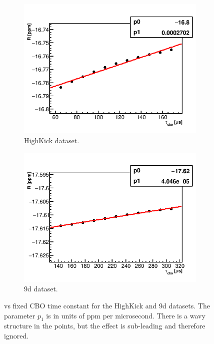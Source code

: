 \begin{figure}[h]
\centering
    \begin{subfigure}[t]{0.45\textwidth}
        \centering
        \includegraphics[width=\textwidth]{FullRatio_R_Vs_tau_cbo_Canv_HK}
        \caption{HighKick dataset.}
    \end{subfigure}%
    \hspace{1cm}
    \begin{subfigure}[t]{0.45\textwidth}
        \centering
        \includegraphics[width=\textwidth]{FullRatio_R_Vs_tau_cbo_Canv_9d}
        \caption{9d dataset.}
    \end{subfigure}
\caption[]{\R vs fixed CBO time constant for the HighKick and 9d datasets. The parameter $p_{1}$ is in units of ppm per microsecond. There is a wavy structure in the points, but the effect is sub-leading and therefore ignored.}
\label{fig:CBOfixedLifetime}
\end{figure}


